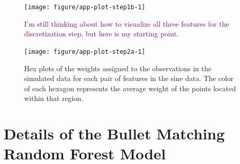 \documentclass[AMS,STIX2COL]{WileyNJD-v2}\usepackage[]{graphicx}\usepackage[]{color}
\newenvironment{knitrout}{}{} %
\newcommand{\kgc}[1]{\textcolor{purple}{#1}}
\newcommand{\data}{sine data}
\begin{document}
{\begin{figure}[!t]
\centering
\begin{knitrout}
\color{fgcolor}
\texttt{[image: figure/app-plot-step1b-1]} 

\end{knitrout}
\caption{\kgc{I'm still thinking about how to visualize all three features for the discretization step, but here is my starting point.}}
\label{fig:app-plot-step1b}
\end{figure}

\begin{figure}[!t]
\centering
\begin{knitrout}
\color{fgcolor}
\texttt{[image: figure/app-plot-step2a-1]} 

\end{knitrout}
\caption{Hex plots of the weights assigned to the observations in the simulated data for each pair of features in the \data. The color of each hexagon represents the average weight of the points located within that region.}
\label{fig:app-plot-step2a}
\end{figure}

\section{Details of the Bullet Matching Random Forest Model} \label{hamby-rf}




}
\end{document}
